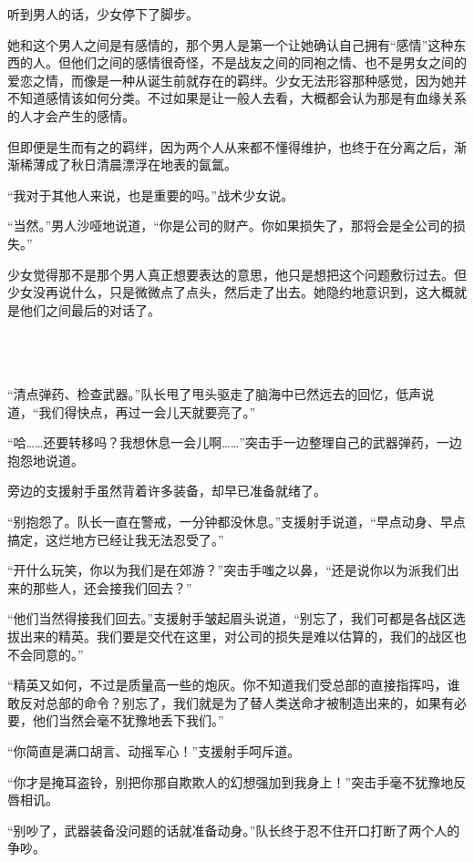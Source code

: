 听到男人的话，少女停下了脚步。

她和这个男人之间是有感情的，那个男人是第一个让她确认自己拥有“感情”这种东西的人。但他们之间的感情很奇怪，不是战友之间的同袍之情、也不是男女之间的爱恋之情，而像是一种从诞生前就存在的羁绊。少女无法形容那种感觉，因为她并不知道感情该如何分类。不过如果是让一般人去看，大概都会认为那是有血缘关系的人才会产生的感情。

但即便是生而有之的羁绊，因为两个人从来都不懂得维护，也终于在分离之后，渐渐稀薄成了秋日清晨漂浮在地表的氤氲。

“我对于其他人来说，也是重要的吗。”战术少女说。

“当然。”男人沙哑地说道，“你是公司的财产。你如果损失了，那将会是全公司的损失。”

少女觉得那不是那个男人真正想要表达的意思，他只是想把这个问题敷衍过去。但少女没再说什么，只是微微点了点头，然后走了出去。她隐约地意识到，这大概就是他们之间最后的对话了。

 \section*{}

“清点弹药、检查武器。”队长甩了甩头驱走了脑海中已然远去的回忆，低声说道，“我们得快点，再过一会儿天就要亮了。”

“哈……还要转移吗？我想休息一会儿啊……”突击手一边整理自己的武器弹药，一边抱怨地说道。

旁边的支援射手虽然背着许多装备，却早已准备就绪了。

“别抱怨了。队长一直在警戒，一分钟都没休息。”支援射手说道，“早点动身、早点搞定，这烂地方已经让我无法忍受了。”

“开什么玩笑，你以为我们是在郊游？”突击手嗤之以鼻，“还是说你以为派我们出来的那些人，还会接我们回去？”

“他们当然得接我们回去。”支援射手皱起眉头说道，“别忘了，我们可都是各战区选拔出来的精英。我们要是交代在这里，对公司的损失是难以估算的，我们的战区也不会同意的。”

“精英又如何，不过是质量高一些的炮灰。你不知道我们受总部的直接指挥吗，谁敢反对总部的命令？别忘了，我们就是为了替人类送命才被制造出来的，如果有必要，他们当然会毫不犹豫地丢下我们。”

“你简直是满口胡言、动摇军心！”支援射手呵斥道。

“你才是掩耳盗铃，别把你那自欺欺人的幻想强加到我身上！”突击手毫不犹豫地反唇相讥。

“别吵了，武器装备没问题的话就准备动身。”队长终于忍不住开口打断了两个人的争吵。

